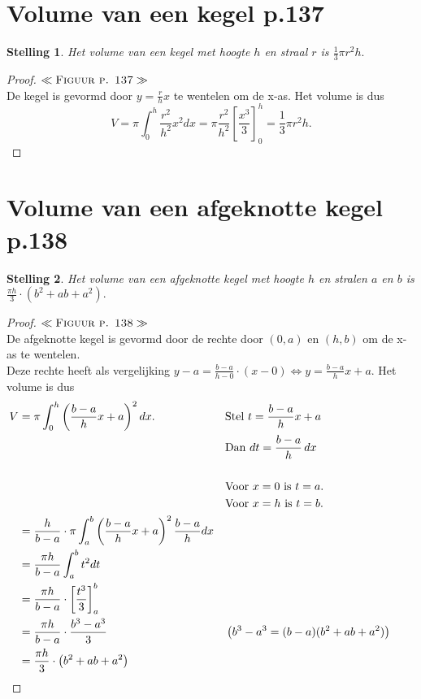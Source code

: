 \documentclass{article}
\newtheorem*{Stelling}{Stelling}
\begin{document}
\section{Volume van een kegel p.137}
\begin{Stelling}
    Het volume van een kegel met hoogte $h$ en straal $r$ is $\frac{1}{3}\pi r^2h.$
\end{Stelling}
\begin{proof}
   $\ll\textsc{Figuur p. 137}\gg$\\ De kegel is gevormd door $y=\frac{r}{h}x$ te wentelen om de x-as. Het volume is dus $$V = \pi\int_0^h \frac{r^2}{h^2}x^2 dx= \pi \frac{r^2}{h^2} \left[\frac{x^3}{3}\right]_0^h = \frac{1}{3}\pi r^2h.$$
\end{proof}
\section{Volume van een afgeknotte kegel p.138}
\begin{Stelling}
    Het volume van een afgeknotte kegel met hoogte $h$ en stralen $a$ en $b$ is $\frac{\pi h}{3}\cdot \left(b^2+ab+a^2\right).$
\end{Stelling}
\begin{proof}
    $\ll\textsc{Figuur p. 138}\gg$\\ De afgeknotte kegel is gevormd door de rechte door $(0,a)$ en $(h,b)$ om de x-as te wentelen. \\Deze rechte heeft als vergelijking $y-a = \frac{b-a}{h-0}\cdot(x-0) \iff y = \frac{b-a}{h}x+a$.
    Het volume is dus 
    \begin{alignat*}{3}
        V &= \pi\int_0^h\left(\frac{b-a}{h}x+a\right)^2 dx. \quad &&\text{Stel } t=\frac{b-a}{h}x+a\\
        & &&\text{Dan }dt = \frac{b-a}{h}\, dx\\
        \\&&&\text{Voor } x=0 \text{ is } t=a.&&\\
        &&&\text{Voor } x=h \text{ is } t=b.&&\\
    &=\frac{h}{b-a}\cdot\pi\int_a^b\left(\frac{b-a}{h}x+a\right)^2\frac{b-a}{h} dx\\ &= \frac{\pi h}{b-a}\int_a^bt^2 dt\\&= \frac{\pi h}{b-a} \cdot \left[\frac{t^3}{3}\right]_a^b\\&=\frac{\pi h}{b-a}\cdot\frac{b^3-a^3}{3}&&\left(\tiny b^3-a^3 = (b-a)(b^2+ab+a^2)\right)\\
    &=\frac{\pi h}{3}\cdot\left(b^2+ab+a^2\right)
    \end{alignat*}
\end{proof}
\newpage
\end{document}
